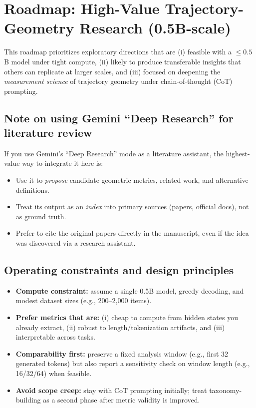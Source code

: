 
\section{Roadmap: High-Value Trajectory-Geometry Research (0.5B-scale)}\label{sec:roadmap}

This roadmap prioritizes exploratory directions that are (i) feasible with a $\leq 0.5$B model under tight compute, (ii) likely to produce transferable insights that others can replicate at larger scales, and (iii) focused on deepening the \emph{measurement science} of trajectory geometry under chain-of-thought (CoT) prompting.

\subsection{Note on using Gemini ``Deep Research'' for literature review}

If you use Gemini's ``Deep Research'' mode as a literature assistant, the highest-value way to integrate it here is:
\begin{itemize}[leftmargin=*]
\item Use it to \emph{propose} candidate geometric metrics, related work, and alternative definitions.
\item Treat its output as an \emph{index} into primary sources (papers, official docs), not as ground truth.
\item Prefer to cite the original papers directly in the manuscript, even if the idea was discovered via a research assistant.
\end{itemize}

\subsection{Operating constraints and design principles}

\begin{itemize}[leftmargin=*]
\item \textbf{Compute constraint:} assume a single 0.5B model, greedy decoding, and modest dataset sizes (e.g., 200--2{,}000 items).
\item \textbf{Prefer metrics that are:} (i) cheap to compute from hidden states you already extract, (ii) robust to length/tokenization artifacts, and (iii) interpretable across tasks.
\item \textbf{Comparability first:} preserve a fixed analysis window (e.g., first 32 generated tokens) but also report a sensitivity check on window length (e.g., 16/32/64) when feasible.
\item \textbf{Avoid scope creep:} stay with CoT prompting initially; treat taxonomy-building as a second phase after metric validity is improved.
\end{itemize}

